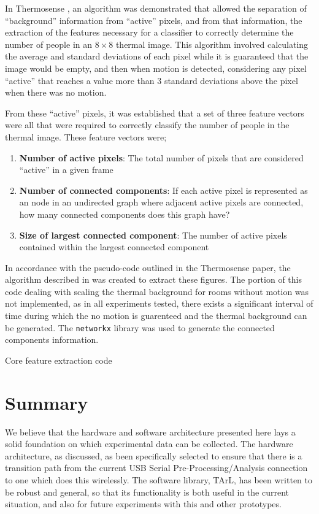 \documentclass[../thesis/thesis.tex]{subfiles}
\begin{document}
In Thermosense \cite{beltran2013thermosense}, an algorithm was demonstrated that allowed the separation of ``background'' information from ``active'' pixels, and from that information, the extraction of the features necessary for a classifier to correctly determine the number of people in an $8\times8$ thermal image. This algorithm involved calculating the average and standard deviations of each pixel while it is guaranteed that the image would be empty, and then when motion is detected, considering any pixel ``active'' that reaches a value more than 3 standard deviations above the pixel when there was no motion.

From these ``active'' pixels, it was established that a set of three feature vectors were all that were required to correctly classify the number of people in the thermal image. These feature vectors were;
\begin{enumerate}
\item \textbf{Number of active pixels}: The total number of pixels that are considered ``active'' in a given frame
\item \textbf{Number of connected components}: If each active pixel is represented as an node in an undirected graph where adjacent active pixels are connected, how many connected components does this graph have?
\item \textbf{Size of largest connected component}: The number of active pixels contained within the largest connected component
\end{enumerate}

In accordance with the pseudo-code outlined in the Thermosense paper, the algorithm described in  was created to extract these figures. The portion of this code dealing with scaling the thermal background for rooms without motion was not implemented, as in all experiments tested, there exists a significant interval of time during which the no motion is guarenteed and the thermal background can be generated. The \texttt{networkx} library was used to generate the connected components information.

\begin{listing}
\centering

\caption{Core feature extraction code}
\label{lst:exps:featcode}
\end{listing}


\section{Summary}
We believe that the hardware and software architecture presented here lays a solid foundation on which experimental data can be collected. The hardware architecture, as discussed, as been specifically selected to ensure that there is a transition path from the current USB Serial Pre-Processing/Analysis connection to one which does this wirelessly. The software library, TArL, has been written to be robust and general, so that its functionality is both useful in the current situation, and also for future experiments with this and other prototypes.
 
\end{document}
